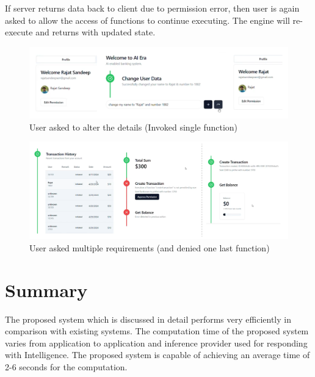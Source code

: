 \noindent If server returns data back to client due to permission error, then user is again asked to allow the access of functions to continue executing. The engine will re-execute and returns with updated state.

\begin{figure}[h!]
    \centering
    \includegraphics[width=\textwidth]{Images/Block_Diag/invoke-one-function.png}
    \caption{User asked to alter the details (Invoked single function)}
\end{figure}


\begin{figure}[h!]
    \centering
    \includegraphics[width=\textwidth]{Images/Block_Diag/transaction-example.png}
    \caption{User asked multiple requirements (and denied one last function)}
\end{figure}


\section{Summary}


\noindent
The proposed system which is discussed in detail performs very efficiently in comparison with existing systems. The computation time of the proposed system varies from application to application and inference provider used for responding with Intelligence. The proposed system is capable of achieving an average time of 2-6 seconds for the computation.

\clearpage
